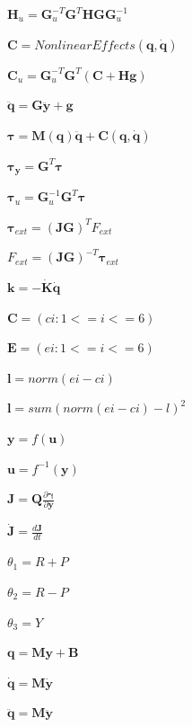 \documentclass{article}
\begin{document}
$ \mathbf{H}_u = \mathbf{G}_u^{-T} \mathbf{G}^T \mathbf{H}\mathbf{G}
\mathbf{G}_u^{-1}$
\pagebreak

$ \mathbf{C} = NonlinearEffects(\mathbf{q}, \mathbf{\dot{q}}) $
\pagebreak

$ \mathbf{C}_u = \mathbf{G}_u^{-T} \mathbf{G}^T (\mathbf{C} +
\mathbf{H}\mathbf{g}) $
\pagebreak

$ \mathbf{\ddot{q}} = \mathbf{G}\mathbf{\ddot{y}} + \mathbf{g} $
\pagebreak

$ \mathbf{\tau} = \mathbf{M}(\mathbf{q})\mathbf{\ddot{q}} +
\mathbf{C}(\mathbf{q},\mathbf{\dot{q}}) $
\pagebreak

$ \mathbf{\tau_y} =
\mathbf{G}^T \mathbf{\tau} $
\pagebreak

$ \mathbf{\tau}_u =
\mathbf{G}^{-1}_u\mathbf{G}^T\mathbf{\tau} $
\pagebreak

$ \mathbf{\tau}_{ext} = (\mathbf{J}\mathbf{G})^T F_{ext} $
\pagebreak

$ F_{ext} = (\mathbf{J}\mathbf{G})^{-T} \mathbf{\tau}_{ext} $
\pagebreak

$ {\mathbf{k}} = -\dot{\mathbf{K}}\dot{\mathbf{q}} $
\pagebreak

$ \mathbf{C} = (ci: 1<=i<=6)$
\pagebreak

$ \mathbf{E} = (ei: 1<=i<=6)$
\pagebreak

$ \mathbf{l} = norm(ei-ci)$
\pagebreak

$ \mathbf{l} = sum(norm(ei-ci) - l)^2$
\pagebreak

$ \mathbf{y} = f(\mathbf{u})$
\pagebreak

$ \mathbf{u} = f^{-1}(\mathbf{y})$
\pagebreak

$ \mathbf{J} = \mathbf{Q} \frac{\partial \mathbf{\gamma}}{\partial
\mathbf{y}} $
\pagebreak

$ \dot{\mathbf{J}} = \frac{d\mathbf{J}}{dt} $
\pagebreak

$\theta_1 = R + P $
\pagebreak

$ \theta_2 = R - P $
\pagebreak

$ \theta_3 = Y $
\pagebreak

$ \mathbf{q} = \mathbf{M} \mathbf{y} + \mathbf{B} $
\pagebreak

$ \dot{\mathbf{q}} = \mathbf{M} \dot{\mathbf{y}} $
\pagebreak

$ \ddot{\mathbf{q}} = \mathbf{M} \ddot{\mathbf{y}} $
\pagebreak
\end{document}
